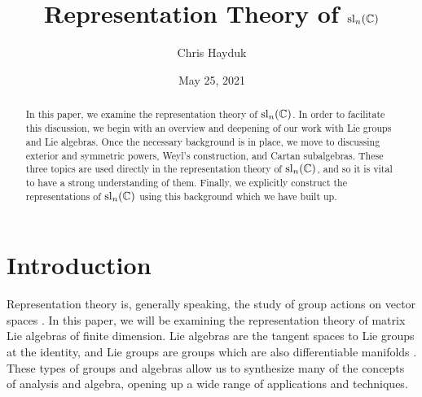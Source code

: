 \documentclass[11pt, a4paper, oneside]{article}
\theoremstyle{plain}
\theoremstyle{definition}
\theoremstyle{example}
\begin{document}
\title{Representation Theory of $\mathrm{sl}_n(\mathbb{C})$}
\author{Chris Hayduk}
\date{May 25, 2021}
\maketitle

\begin{abstract}
In this paper, we examine the representation theory of $\mathrm{sl}_n(\mathbb{C})$. In order to facilitate this discussion, we begin with an overview and deepening of our work with Lie groups and Lie algebras. Once the necessary background is in place, we move to discussing exterior and symmetric powers, Weyl's construction, and Cartan subalgebras. These three topics are used directly in the representation theory of $\mathrm{sl}_n(\mathbb{C})$, and so it is vital to have a strong understanding of them. Finally, we explicitly construct the representations of $\mathrm{sl}_n(\mathbb{C})$ using this background which we have built up.
\end{abstract}




\section{Introduction}

Representation theory is, generally speaking, the study of group actions on vector spaces \cite{fulton}. In this paper, we will be examining the representation theory of matrix Lie algebras of finite dimension. Lie algebras are the tangent spaces to Lie groups at the identity, and Lie groups are groups which are also differentiable manifolds \cite{liealgebrawiki, liegroupwiki}. These types of groups and algebras allow us to synthesize many of the concepts of analysis and algebra, opening up a wide range of applications and techniques.
\end{document}
